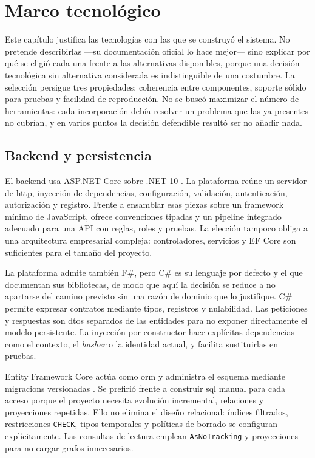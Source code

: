 \chapter{Marco tecnológico}

Este capítulo justifica las tecnologías con las que se construyó el sistema. No pretende describirlas ---su documentación oficial lo hace mejor--- sino explicar por qué se eligió cada una frente a las alternativas disponibles, porque una decisión tecnológica sin alternativa considerada es indistinguible de una costumbre. La selección persigue tres propiedades: coherencia entre componentes, soporte sólido para pruebas y facilidad de reproducción. No se buscó maximizar el número de herramientas: cada incorporación debía resolver un problema que las ya presentes no cubrían, y en varios puntos la decisión defendible resultó ser no añadir nada.

\section{Backend y persistencia}

El backend usa ASP.NET Core sobre .NET 10 \cite{aspnetcore}. La plataforma reúne un servidor de \gls{http}, inyección de dependencias, configuración, validación, autenticación, autorización y registro. Frente a ensamblar esas piezas sobre un framework mínimo de JavaScript, ofrece convenciones tipadas y un pipeline integrado adecuado para una API con reglas, roles y pruebas. La elección tampoco obliga a una arquitectura empresarial compleja: controladores, servicios y EF Core son suficientes para el tamaño del proyecto.

La plataforma admite también F\#, pero C\# es su lenguaje por defecto y el que documentan sus bibliotecas, de modo que aquí la decisión se reduce a no apartarse del camino previsto sin una razón de dominio que lo justifique. C\# permite expresar contratos mediante tipos, registros y nulabilidad. Las peticiones y respuestas son \glspl{dto} separados de las entidades para no exponer directamente el modelo persistente. La inyección por constructor hace explícitas dependencias como el contexto, el \emph{hasher} o la identidad actual, y facilita sustituirlas en pruebas.

Entity Framework Core actúa como \gls{orm} y administra el esquema mediante \glspl{migracion} versionadas \cite{efcore}. Se prefirió frente a construir \gls{sql} manual para cada acceso porque el proyecto necesita evolución incremental, relaciones y proyecciones repetidas. Ello no elimina el diseño relacional: índices filtrados, restricciones \texttt{CHECK}, tipos temporales y políticas de borrado se configuran explícitamente. Las consultas de lectura emplean \texttt{AsNoTracking} y proyecciones para no cargar grafos innecesarios.

